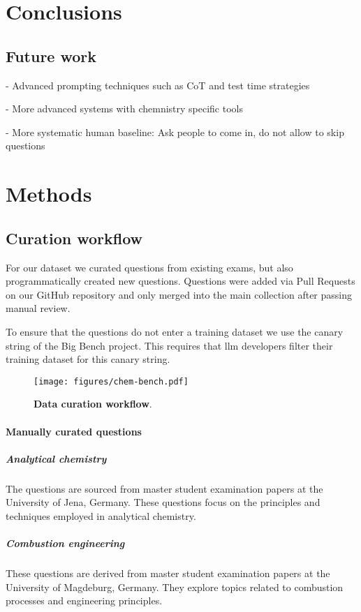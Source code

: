 \documentclass[11pt, oneside]{article}
\begin{document}
\section{Conclusions}

\subsection{Future work}
- Advanced prompting techniques such as CoT and test time strategies

- More advanced systems with chemnistry specific tools

- More systematic human baseline: Ask people to come in, do not allow to skip questions

\section{Methods}

\subsection{Curation workflow}\label{sec:curation}
For our dataset we curated questions from existing exams, but also programmatically created new questions.
Questions were added via Pull Requests on our GitHub repository and only merged into the main collection after passing manual review.

To ensure that the questions do not enter a training dataset we use the canary string of the Big Bench project.
This requires that \Gls{llm} developers filter their training dataset for this canary string.

\begin{figure}
    \texttt{[image: figures/chem-bench.pdf]}
        \caption{\textbf{Data curation workflow}.}
\end{figure}

\paragraph{Manually curated questions}

\subparagraph{Analytical chemistry}
The questions are sourced from master student examination papers at the University of Jena, Germany. These questions focus on the principles and techniques employed in analytical chemistry.

\subparagraph{Combustion engineering}
These questions are derived from master student examination papers at the University of Magdeburg, Germany. They explore topics related to combustion processes and engineering principles.
\end{document}
